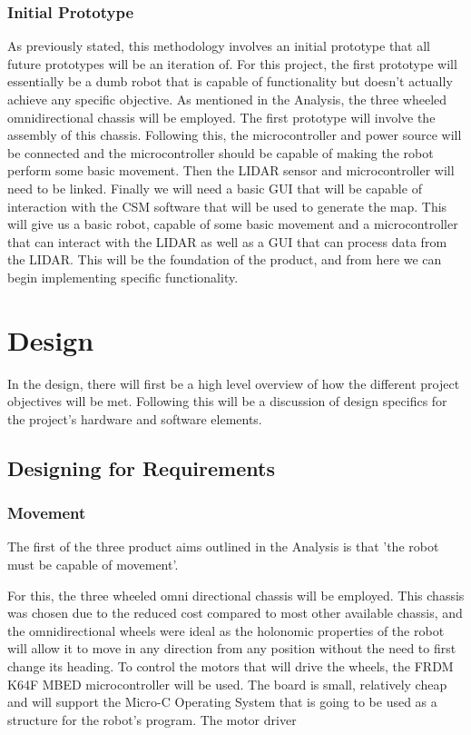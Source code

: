 		\subsection{Initial Prototype}
		As previously stated, this methodology involves an initial prototype that all future prototypes will be an iteration of. For this project, the first prototype will essentially be a dumb robot that is capable of functionality but doesn't actually achieve any specific objective. As mentioned in the Analysis, the three wheeled omnidirectional chassis will be employed. The first prototype will involve the assembly of this chassis. Following this, the microcontroller and power source will be connected and the microcontroller should be capable of making the robot perform some basic movement. Then the LIDAR sensor and microcontroller will need to be linked. Finally we will need a basic GUI that will be capable of interaction with the CSM software that will be used to generate the map. This will give us a basic robot, capable of some basic movement and a microcontroller that can interact with the LIDAR as well as a GUI that can process data from the LIDAR. This will be the foundation of the product, and from here we can begin implementing specific functionality.
	
	\chapter{Design}
	In the design, there will first be a high level overview of how the different project objectives will be met. Following this will be a discussion of design specifics for the project's hardware and software elements.
	
	\section{Designing for Requirements}
		\subsection{Movement}
		The first of the three product aims outlined in the Analysis is that 'the robot must be capable of movement'.
			
		For this, the three wheeled omni directional chassis will be employed. This chassis was chosen due to the reduced cost compared to most other available chassis, and the omnidirectional wheels were ideal as the holonomic properties of the robot will allow it to move in any direction from any position without the need to first change its heading. To control the motors that will drive the wheels, the FRDM K64F MBED microcontroller will be used. The board is small, relatively cheap and will support the Micro-C Operating System that is going to be used as a structure for the robot's program. The motor driver
			
